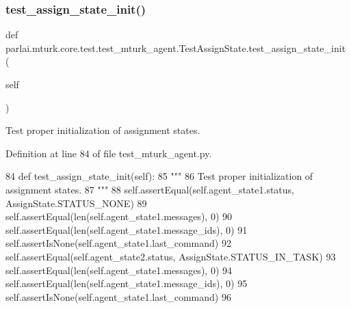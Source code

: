 \subsubsection{\texorpdfstring{test\+\_\+assign\+\_\+state\+\_\+init()}{test\_assign\_state\_init()}}
{\footnotesize\ttfamily def parlai.\+mturk.\+core.\+test.\+test\+\_\+mturk\+\_\+agent.\+Test\+Assign\+State.\+test\+\_\+assign\+\_\+state\+\_\+init (\begin{DoxyParamCaption}\item[{}]{self }\end{DoxyParamCaption})}

\begin{DoxyVerb}Test proper initialization of assignment states.
\end{DoxyVerb}
 

Definition at line 84 of file test\+\_\+mturk\+\_\+agent.\+py.


\begin{DoxyCode}
84     \textcolor{keyword}{def }test\_assign\_state\_init(self):
85         \textcolor{stringliteral}{"""}
86 \textcolor{stringliteral}{        Test proper initialization of assignment states.}
87 \textcolor{stringliteral}{        """}
88         self.assertEqual(self.agent\_state1.status, AssignState.STATUS\_NONE)
89         self.assertEqual(len(self.agent\_state1.messages), 0)
90         self.assertEqual(len(self.agent\_state1.message\_ids), 0)
91         self.assertIsNone(self.agent\_state1.last\_command)
92         self.assertEqual(self.agent\_state2.status, AssignState.STATUS\_IN\_TASK)
93         self.assertEqual(len(self.agent\_state1.messages), 0)
94         self.assertEqual(len(self.agent\_state1.message\_ids), 0)
95         self.assertIsNone(self.agent\_state1.last\_command)
96 
\end{DoxyCode}
\mbox{\label{classparlai_1_1mturk_1_1core_1_1test_1_1test__mturk__agent_1_1TestAssignState_a4b7c9591e63e98797816e9a17599c706}} 
